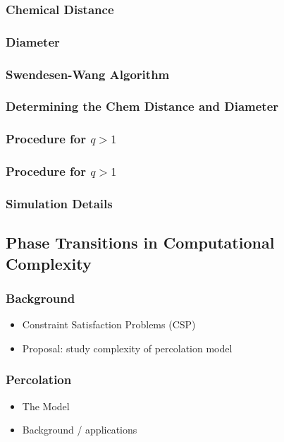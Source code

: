 \documentclass[11pt]{article}
\begin{document}
\subsubsection{Chemical Distance}
\label{sec-1_3_3}
\subsubsection{Diameter}
\label{sec-1_3_4}
\subsubsection{Swendesen-Wang Algorithm}
\label{sec-1_3_5}
\subsubsection{Determining the Chem Distance and Diameter}
\label{sec-1_3_6}
\subsubsection{Procedure for $q>1$}
\label{sec-1_3_7}
\subsubsection{Procedure for $q>1$}
\label{sec-1_3_8}
\subsubsection{Simulation Details}
\label{sec-1_3_9}
\subsection{Phase Transitions in Computational Complexity}
\label{sec-1_4}
\subsubsection{Background}
\label{sec-1_4_1}
\begin{itemize}

\item Constraint Satisfaction Problems (CSP)\\
\label{sec-1_4_1_1}%
\item Proposal: study complexity of percolation model\\
\label{sec-1_4_1_2}%
\end{itemize} %
\subsubsection{Percolation}
\label{sec-1_4_2}
\begin{itemize}

\item The Model\\
\label{sec-1_4_2_1}%
\item Background / applications\\
\label{sec-1_4_2_2}%
\end{itemize} %
\end{document}
